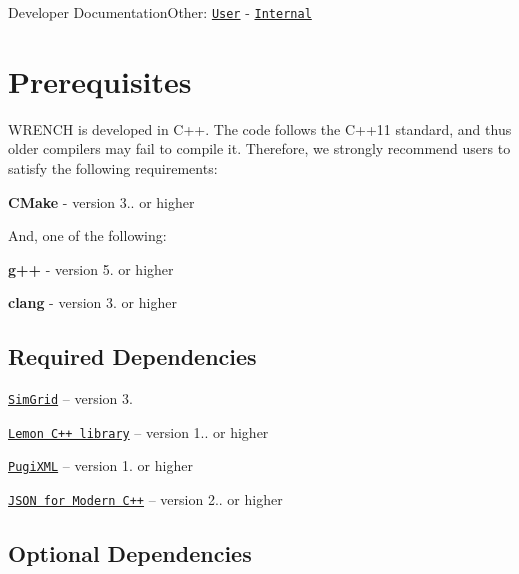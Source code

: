 Developer DocumentationOther\+: \href{../user/install.html}{\tt User} -\/ \href{../internal/install.html}{\tt Internal}\hypertarget{install_install-prerequisites}{}\section{Prerequisites}\label{install_install-prerequisites}
W\+R\+E\+N\+CH is developed in {\ttfamily C++}. The code follows the C++11 standard, and thus older compilers may fail to compile it. Therefore, we strongly recommend users to satisfy the following requirements\+:


\begin{DoxyItemize}
\item {\bfseries C\+Make} -\/ version 3.. or higher
\end{DoxyItemize}

And, one of the following\+:
\begin{DoxyItemize}
\item {\bfseries g++} -\/ version 5. or higher
\item {\bfseries clang} -\/ version 3. or higher
\end{DoxyItemize}\hypertarget{install_install-prerequisites-dependencies}{}\subsection{Required Dependencies}\label{install_install-prerequisites-dependencies}

\begin{DoxyItemize}
\item \href{https://simgrid.org/}{\tt Sim\+Grid} -- version 3.
\item \href{http://lemon.cs.elte.hu/}{\tt Lemon C++ library} -- version 1.. or higher
\item \href{http://pugixml.org/}{\tt Pugi\+X\+ML} -- version 1. or higher
\item \href{https://github.com/nlohmann/json}{\tt J\+S\+ON for Modern C++} -- version 2.. or higher
\end{DoxyItemize}\hypertarget{install_install-prerequisites-opt-dependencies}{}\subsection{Optional Dependencies}\label{install_install-prerequisites-opt-dependencies}

